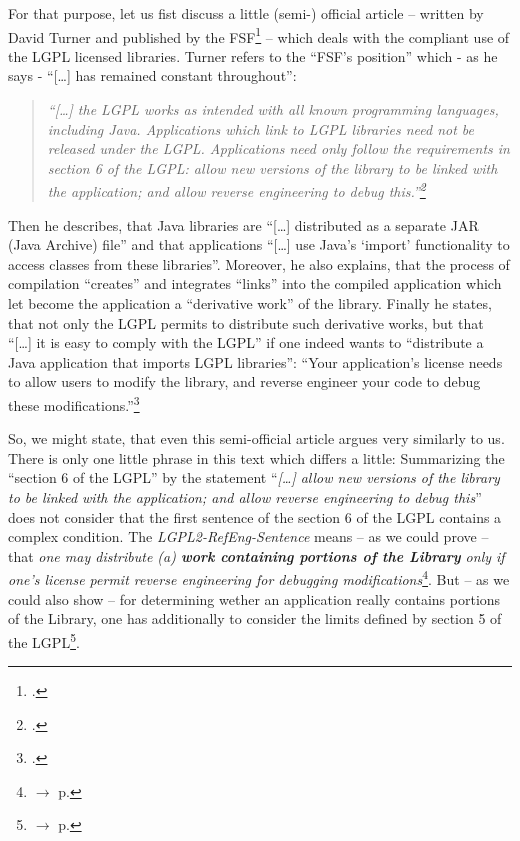 For that purpose, let us fist discuss a little (semi-) official article --
written by David Turner and published by the FSF\footcite[cf.][\nopage
wp.]{Turner2004a} -- which deals with the compliant use of the LGPL licensed
libraries. Turner refers to the \enquote{FSF's position} which - as he says -
\enquote{[\ldots] has remained constant throughout}:

\begin{quote}\noindent\emph{\enquote{[\ldots] the LGPL works as intended with
all known programming languages, including Java. Applications which link to LGPL
libraries need not be released under the LGPL. Applications need only follow the
requirements in section 6 of the LGPL: allow new versions of the library to be
linked with the application; and allow reverse engineering to debug
this.}\footcite[cf.][\nopage wp]{Turner2004a}}\end{quote}

Then he describes, that Java libraries are \enquote{[\ldots] distributed as a
separate JAR (Java Archive) file} and that applications \enquote{[\ldots] use
Java's \enquote{import} functionality to access classes from these libraries}.
Moreover, he also explains, that the process of compilation \enquote{creates}
and integrates \enquote{links} into the compiled application which let become
the application a \enquote{derivative work} of the library.
Finally he states, that not only the LGPL permits to distribute such derivative
works, but that \enquote{[\ldots] it is easy to comply with the LGPL} if one
indeed wants to \enquote{distribute a Java application that imports LGPL
libraries}: \enquote{Your application's license needs to allow users to modify
the library, and reverse engineer your code to debug these
modifications.}\footcite[cf.][\nopage wp.]{Turner2004a}

So, we might state, that even this semi-official article argues very similarly
to us. There is only one little phrase in this text which differs a little:
Summarizing the \enquote{section 6 of the LGPL} by the statement
\enquote{\emph{[\ldots] allow new versions of the library to be linked with the
application; and allow reverse engineering to debug this}} does not consider
that the first sentence of the section 6 of the LGPL contains a complex
condition. The \emph{LGPL2-RefEng-Sentence} means -- as we could prove -- that
\emph{one may distribute (a) \textbf{work containing portions of the Library}
only if one's license permit reverse engineering for debugging
modifications}\footnote{$\rightarrow$ p.
\pageref{RevEngEssentialLgplSection6Meaning}}. But -- as we could also show --
for determining wether an application really contains portions of the Library,
one has additionally to consider the limits defined by section 5 of the
LGPL\footnote{$\rightarrow$ p. \pageref{RevEngLgplSection5Derivation}}.

